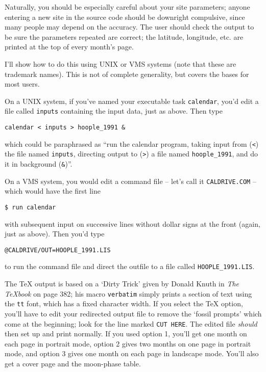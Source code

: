 Naturally, you should be especially careful about your site parameters;
anyone entering a new site in the source code should be downright
compulsive, since many people may depend on the accuracy.  The user
should check the  output to be sure the parameters repeated are correct; 
the latitude, longitude, etc. are printed at the top of every month's page.


I'll show how to do this using UNIX or VMS systems (note that these
are trademark names).
This is not of complete generality, but covers the bases for most
users.

On a UNIX system, if you've named your executable task {\tt calendar},
you'd edit a file called {\tt inputs} containing the input data,
just as above.  Then type 
\par

{\tt \qquad calendar < inputs > hoople\_1991 \&}

\par
which could be paraphrased as ``run the calendar program, taking 
input from ({\tt <}) the file named {\tt inputs}, 
directing output to ({\tt >}) a 
file named {\tt hoople\_1991}, and do it in background ({\tt \&})''. 

On a VMS system, you would edit a command file -- let's call
it {\tt CALDRIVE.COM} -- which would have the first line
\par
{\tt \qquad \$ run calendar}
\par
with subsequent input on successive lines without dollar signs at the
front (again, just as above).  Then you'd type 
\par
{\tt \qquad @CALDRIVE/OUT=HOOPLE\_1991.LIS}
\par
to run the command file and direct the outfile to a file called 
{\tt HOOPLE\_1991.LIS}.


The TeX output is based on a `Dirty Trick' given by Donald Knuth in
{\it The TeXbook} on page 382; his macro {\tt verbatim} 
simply prints a section of text using the {\tt tt} font, which has
a fixed character width.  If you select the TeX option, 
you'll have to edit your redirected output file to
remove the `fossil prompts' which come at the beginning;
look for the line marked {\tt CUT HERE}.  The edited file
{\it should} then set up and print normally.  If you
used option 1, you'll get one month on
each page in portrait mode, option 2 gives two months on 
one page in portrait mode, and option 3 gives one month on
each page in landscape mode. You'll also get a cover page 
and the moon-phase table.  

